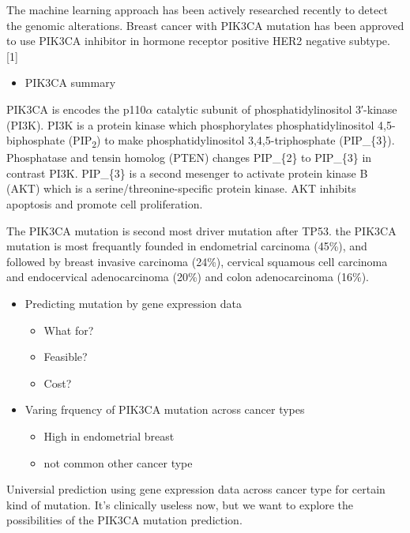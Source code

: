\documentclass[10pt,letterpaper]{article}
\providecommand{\tightlist}{%
  \setlength{\itemsep}{0pt}\setlength{\parskip}{0pt}}
\begin{document}
The machine learning approach has been actively researched recently to
detect the genomic alterations. Breast cancer with PIK3CA mutation has
been approved to use PIK3CA inhibitor in hormone receptor positive HER2
negative subtype. {[}1{]}

\begin{itemize}
\tightlist
\item
  PIK3CA summary
\end{itemize}

PIK3CA is encodes the p110\(\alpha\) catalytic subunit of
phosphatidylinositol 3′-kinase (PI3K). PI3K is a protein kinase which
phosphorylates phosphatidylinositol 4,5-biphosphate
(PIP\textsubscript{2}) to make phosphatidylinositol 3,4,5-triphosphate
(PIP\_\{3\}). Phosphatase and tensin homolog (PTEN) changes PIP\_\{2\}
to PIP\_\{3\} in contrast PI3K. PIP\_\{3\} is a second mesenger to
activate protein kinase B (AKT) which is a serine/threonine-specific
protein kinase. AKT inhibits apoptosis and promote cell proliferation.

The PIK3CA mutation is second most driver mutation after TP53. the
PIK3CA mutation is most frequantly founded in endometrial carcinoma
(45\%), and followed by breast invasive carcinoma (24\%), cervical
squamous cell carcinoma and endocervical adenocarcinoma (20\%) and colon
adenocarcinoma (16\%).

\begin{itemize}
\tightlist
\item
  Predicting mutation by gene expression data

  \begin{itemize}
  \tightlist
  \item
    What for?\\
  \item
    Feasible?\\
  \item
    Cost?
  \end{itemize}
\item
  Varing frquency of PIK3CA mutation across cancer types

  \begin{itemize}
  \tightlist
  \item
    High in endometrial breast\\
  \item
    not common other cancer type
  \end{itemize}
\end{itemize}

Universial prediction using gene expression data across cancer type for
certain kind of mutation. It's clinically useless now, but we want to
explore the possibilities of the PIK3CA mutation prediction.
\end{document}
